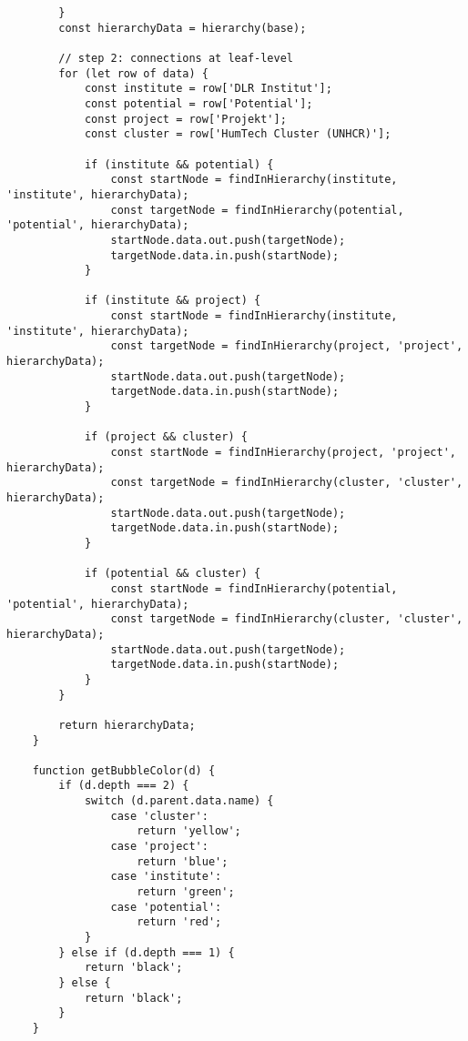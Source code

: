 \begin{lstlisting}
        }
        const hierarchyData = hierarchy(base);
    
        // step 2: connections at leaf-level
        for (let row of data) {
            const institute = row['DLR Institut'];
            const potential = row['Potential'];
            const project = row['Projekt'];
            const cluster = row['HumTech Cluster (UNHCR)'];
    
            if (institute && potential) {
                const startNode = findInHierarchy(institute, 'institute', hierarchyData);
                const targetNode = findInHierarchy(potential, 'potential', hierarchyData);
                startNode.data.out.push(targetNode);
                targetNode.data.in.push(startNode);
            }
    
            if (institute && project) {
                const startNode = findInHierarchy(institute, 'institute', hierarchyData);
                const targetNode = findInHierarchy(project, 'project', hierarchyData);
                startNode.data.out.push(targetNode);
                targetNode.data.in.push(startNode);
            }
    
            if (project && cluster) {
                const startNode = findInHierarchy(project, 'project', hierarchyData);
                const targetNode = findInHierarchy(cluster, 'cluster', hierarchyData);
                startNode.data.out.push(targetNode);
                targetNode.data.in.push(startNode);
            }
    
            if (potential && cluster) {
                const startNode = findInHierarchy(potential, 'potential', hierarchyData);
                const targetNode = findInHierarchy(cluster, 'cluster', hierarchyData);
                startNode.data.out.push(targetNode);
                targetNode.data.in.push(startNode);
            }
        }
    
        return hierarchyData;
    }
    
    function getBubbleColor(d) {
        if (d.depth === 2) {
            switch (d.parent.data.name) {
                case 'cluster':
                    return 'yellow';
                case 'project':
                    return 'blue';
                case 'institute':
                    return 'green';
                case 'potential':
                    return 'red';
            }
        } else if (d.depth === 1) {
            return 'black';
        } else {
            return 'black';
        }
    }
    

\end{lstlisting}
